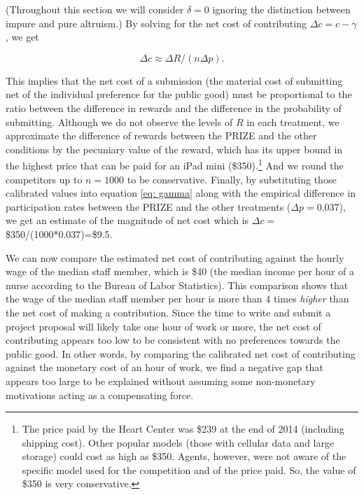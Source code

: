 \documentclass[11pt, titlepage]{article}
\begin{document}
(Throughout this section we will consider \(\delta=0\) ignoring the
distinction between impure and pure altruism.) By solving for the net
cost of contributing \(\Delta c=c-\gamma\), we get

\begin{equation}
  \label{eq: gamma}
  \Delta c\approx  \Delta R / (n\Delta p). 
\end{equation}

This implies that the net cost of a submission (the material cost of
submitting net of the individual preference for the public good) must be
proportional to the ratio between the difference in rewards and the
difference in the probability of submitting. Although we do not observe
the levels of \(R\) in each treatment, we approximate the difference of
rewards between the PRIZE and the other conditions by the pecuniary
value of the reward, which has its upper bound in the highest price that
can be paid for an iPad mini (\$350).\footnote{The price paid by the
  Heart Center was \$239 at the end of 2014 (including shipping cost).
  Other popular models (those with cellular data and large storage)
  could cost as high as \$350. Agents, however, were not aware of the
  specific model used for the competition and of the price paid. So, the
  value of \$350 is very conservative.} And we round the competitors up
to \(n=1000\) to be conservative. Finally, by substituting those
calibrated values into equation \eqref{eq: gamma} along with the
empirical difference in participation rates between the PRIZE and the
other treatments (\(\Delta p=0.037\)), we get an estimate of the
magnitude of net cost which is \(\Delta c=\) \$350/(1000*0.037)=\$9.5.

We can now compare the estimated net cost of contributing against the
hourly wage of the median staff member, which is \$40 (the median income
per hour of a nurse according to the Bureau of Labor Statistics). This
comparison shows that the wage of the median staff member per hour is
more than 4 times \emph{higher} than the net cost of making a
contribution. Since the time to write and submit a project proposal will
likely take one hour of work or more, the net cost of contributing
appears too low to be consistent with no preferences towards the public
good. In other words, by comparing the calibrated net cost of
contributing against the monetary cost of an hour of work, we find a
negative gap that appears too large to be explained without assuming
some non-monetary motivations acting as a compensating force.
\end{document}
